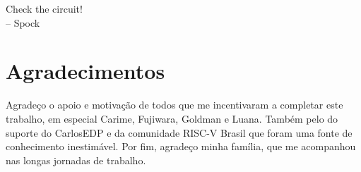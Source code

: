 

\begin{dedicatoria}
    Check the circuit! \\
    – Spock
    \end{dedicatoria}
    
    
    \chapter*{Agradecimentos}
    
    Agradeço o apoio e motivação de todos que me incentivaram a completar 
    este trabalho, em especial Carime, Fujiwara, Goldman e Luana. 
    Também pelo do suporte do CarlosEDP e da comunidade RISC-V Brasil que
    foram uma fonte de conhecimento inestimável.
    Por fim, agradeço minha família, que me acompanhou nas longas jornadas de trabalho.
    
    \printResumoAbstract
    
    
    
    \makeatletter
    \if@openright\cleardoublepage\else\clearpage\fi
    \makeatother
    
    
